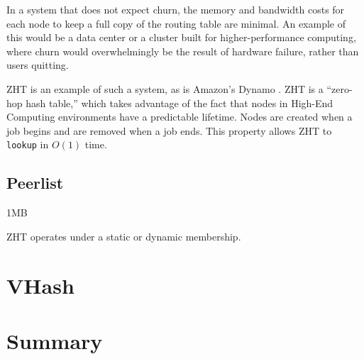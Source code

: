 \documentclass[10pt,letterpaper,twoside]{report}
\begin{document}
In a system that does not expect churn, the memory and bandwidth costs for each node to keep a full copy of the routing table are minimal.
An example of this would be a data center or a cluster built for higher-performance computing, where churn would overwhelmingly be the result of hardware failure, rather than users quitting.

ZHT \cite{li2013zht} is an example of such a system, as is Amazon's Dynamo \cite{dynamo}.
ZHT is a ``zero-hop hash table,'' which takes advantage of the fact that  nodes in  High-End Computing environments have a predictable lifetime.
Nodes are created when a job begins and are removed when a job ends.
This property allows ZHT to \texttt{lookup} in $ O(1) $ time.

\subsection*{Peerlist}1MB 



ZHT operates under a static or dynamic membership.


\section{VHash}


\section{Summary}

\end{document}
